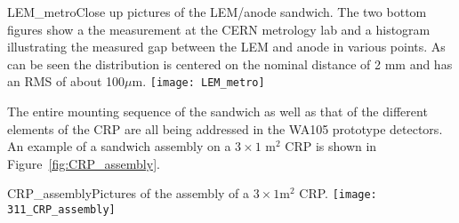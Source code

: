 \begin{cdrfigure}{LEM_metro}{Close up pictures of the LEM/anode sandwich. The two
       bottom figures show a the measurement at the CERN metrology lab
       and a histogram illustrating the measured gap between the LEM
       and anode in various points. As can be seen the distribution is
       centered on the nominal distance of 2 mm and has an RMS of
       about 100$\mu$m.}
     \texttt{[image: LEM\_metro]}
\end{cdrfigure}

The entire mounting sequence of the sandwich as well as that of the different elements of the CRP are all being addressed in the  WA105 prototype detectors. An example of a sandwich assembly on a   $3\times1$  m$^2$ CRP is shown in Figure~\ref{fig:CRP_assembly}.

\begin{cdrfigure}{CRP_assembly}{Pictures of the assembly of a $3\times1$m$^2$ CRP.}
     \texttt{[image: 311\_CRP\_assembly]}  
\end{cdrfigure}